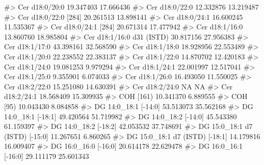 \documentclass[
  letterpaper,
  DIV=11,
  numbers=noendperiod]{scrreprt}
\newenvironment{Shaded}{\begin{snugshade}}{\end{snugshade}}
\newcommand{\CommentTok}[1]{\textcolor[rgb]{0.37,0.37,0.37}{#1}}
\begin{document}
\begin{Shaded}
\begin{Highlighting}[]
\CommentTok{\#\textgreater{} Cer d18:0/20:0                            19.347403 17.666436}
\CommentTok{\#\textgreater{} Cer d18:0/22:0                            12.332876 13.219487}
\CommentTok{\#\textgreater{} Cer d18:0/22:0 [284]                      20.261513 13.898141}
\CommentTok{\#\textgreater{} Cer d18:0/24:1                            16.600245 11.535367}
\CommentTok{\#\textgreater{} Cer d18:0/24:1 [284]                      20.671314 17.477942}
\CommentTok{\#\textgreater{} Cer d18:1/16:0                            13.860760 18.985804}
\CommentTok{\#\textgreater{} Cer d18:1/16:0 d31 (ISTD)                 30.817156 27.956383}
\CommentTok{\#\textgreater{} Cer d18:1/17:0                            43.398161 32.568590}
\CommentTok{\#\textgreater{} Cer d18:1/18:0                            18.928956 22.553489}
\CommentTok{\#\textgreater{} Cer d18:1/20:0                            22.238552 22.383137}
\CommentTok{\#\textgreater{} Cer d18:1/22:0                            14.870702 12.420183}
\CommentTok{\#\textgreater{} Cer d18:1/24:0                            19.081253  9.979294}
\CommentTok{\#\textgreater{} Cer d18:1/24:1                            22.001997 12.517041}
\CommentTok{\#\textgreater{} Cer d18:1/25:0                             9.355901  6.074033}
\CommentTok{\#\textgreater{} Cer d18:1/26:0                            16.493050 11.550025}
\CommentTok{\#\textgreater{} Cer d18:2/22:0                            15.251080 14.630391}
\CommentTok{\#\textgreater{} Cer d18:2/24:0                                   NA        NA}
\CommentTok{\#\textgreater{} Cer d18:2/24:1                            18.568409 15.309935}
\CommentTok{\#\textgreater{} COH [161)                                 10.341370  6.889555}
\CommentTok{\#\textgreater{} COH [95)                                  10.043430  8.084858}
\CommentTok{\#\textgreater{} DG 14:0\_18:1 [{-}14:0]                      53.513073 35.562168}
\CommentTok{\#\textgreater{} DG 14:0\_18:1 [{-}18:1]                      49.420564 51.719982}
\CommentTok{\#\textgreater{} DG 14:0\_18:2 [{-}14:0]                      45.543380 61.159397}
\CommentTok{\#\textgreater{} DG 14:0\_18:2 [{-}18:2]                      42.053532 37.748691}
\CommentTok{\#\textgreater{} DG 15:0\_18:1 d7 (ISTD) [{-}15:0]            11.267651  6.860265}
\CommentTok{\#\textgreater{} DG 15:0\_18:1 d7 (ISTD) [{-}18:1]            14.179816 16.009407}
\CommentTok{\#\textgreater{} DG 16:0\_16:0 [{-}16:0]                      20.614178 22.629478}
\CommentTok{\#\textgreater{} DG 16:0\_16:1 [{-}16:0]                      29.111179 25.601343}

\end{Highlighting}
\end{Shaded}
\end{document}
